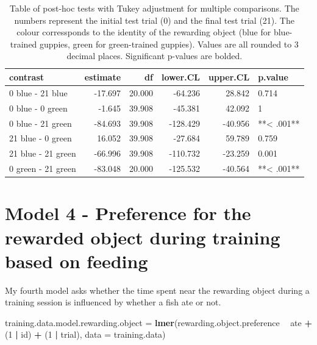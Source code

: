 \documentclass[]{book}
\newenvironment{Shaded}{\begin{snugshade}}{\end{snugshade}}
\newcommand{\KeywordTok}[1]{\textcolor[rgb]{0.13,0.29,0.53}{\textbf{#1}}}
\newcommand{\DataTypeTok}[1]{\textcolor[rgb]{0.13,0.29,0.53}{#1}}
\newcommand{\DecValTok}[1]{\textcolor[rgb]{0.00,0.00,0.81}{#1}}
\newcommand{\StringTok}[1]{\textcolor[rgb]{0.31,0.60,0.02}{#1}}
\newcommand{\OperatorTok}[1]{\textcolor[rgb]{0.81,0.36,0.00}{\textbf{#1}}}
\newcommand{\NormalTok}[1]{#1}
\begin{document}
\begin{table}

\caption{\label{tab:contrasts-table}Table of post-hoc tests with Tukey adjustment for multiple comparisons. The numbers represent the initial test trial (0) and the final test trial (21). The colour corressponds to the identity of the rewarding object (blue for blue-trained guppies, green for green-trained guppies). Values are all rounded to 3 decimal places. Significant p-values are bolded.}
\centering
\begin{tabular}[t]{l|r|r|r|r|l}
\hline
contrast & estimate & df & lower.CL & upper.CL & p.value\\
\hline
0 blue - 21 blue & -17.697 & 20.000 & -64.236 & 28.842 & 0.714\\
\hline
0 blue - 0 green & -1.645 & 39.908 & -45.381 & 42.092 & 1\\
\hline
0 blue - 21 green & -84.693 & 39.908 & -128.429 & -40.956 & **< .001**\\
\hline
21 blue - 0 green & 16.052 & 39.908 & -27.684 & 59.789 & 0.759\\
\hline
21 blue - 21 green & -66.996 & 39.908 & -110.732 & -23.259 & 0.001\\
\hline
0 green - 21 green & -83.048 & 20.000 & -125.532 & -40.564 & **< .001**\\
\hline
\end{tabular}
\end{table}

\chapter{Model 4 - Preference for the rewarded object during training
based on
feeding}\label{model-4---preference-for-the-rewarded-object-during-training-based-on-feeding}

My fourth model asks whether the time spent near the rewarding object
during a training session is influenced by whether a fish ate or not.

\begin{Shaded}
\begin{Highlighting}[]
\NormalTok{training.data.model.rewarding.object =}\StringTok{ }
\StringTok{  }\KeywordTok{lmer}\NormalTok{(rewarding.object.preference }\OperatorTok{~}\StringTok{ }\NormalTok{ate }\OperatorTok{+}\StringTok{ }\NormalTok{(}\DecValTok{1} \OperatorTok{|}\StringTok{ }\NormalTok{id) }\OperatorTok{+}\StringTok{ }\NormalTok{(}\DecValTok{1} \OperatorTok{|}\StringTok{ }\NormalTok{trial),}
       \DataTypeTok{data =}\NormalTok{ training.data)}
\end{Highlighting}
\end{Shaded}
\end{document}
